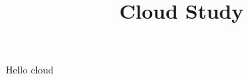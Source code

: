 \documentclass{article}
\begin{document}
\title{Cloud Study}
Hello cloud \cite{CloudStudy}





\end{document}

